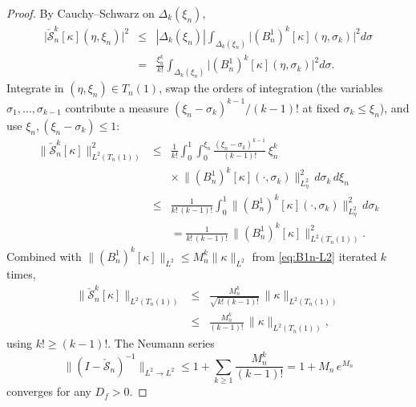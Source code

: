 \documentclass[journal,twoside,web]{ieeecolor}
\begin{document}
\begin{proof}
By Cauchy--Schwarz on $\Delta_k(\xi_n)$,
\begin{eqnarray}
\bigl|\check{\mathcal S}_n^k[\kappa](\eta,\xi_n)\bigr|^2 &\le& |\Delta_k(\xi_n)|\int_{\Delta_k(\xi_n)}\bigl|(B^1_n)^k[\kappa](\eta,\sigma_k)\bigr|^2 d\sigma \nonumber\\
&=& \frac{\xi_n^k}{k!}\int_{\Delta_k(\xi_n)}\bigl|(B^1_n)^k[\kappa](\eta,\sigma_k)\bigr|^2 d\sigma. \label{eq:Sn-CS}
\end{eqnarray}
Integrate in $(\eta,\xi_n)\in T_n(1)$, swap the orders of integration (the variables $\sigma_1,\ldots,\sigma_{k-1}$ contribute a measure $(\xi_n-\sigma_k)^{k-1}/(k-1)!$ at fixed $\sigma_k\le\xi_n$), and use $\xi_n,(\xi_n-\sigma_k)\le 1$:
\begin{eqnarray}
\|\check{\mathcal S}_n^k[\kappa]\|_{L^2(T_n(1))}^2 &\le& \frac{1}{k!}\int_0^1\!\!\int_0^{\xi_n}\!\!\frac{(\xi_n-\sigma_k)^{k-1}}{(k-1)!}\,\xi_n^k \nonumber\\
&& \times\,\|(B^1_n)^k[\kappa](\cdot,\sigma_k)\|_{L^2_\eta}^2\,d\sigma_k\,d\xi_n \nonumber\\
&\le& \frac{1}{k!\,(k-1)!}\int_0^1\!\!\|(B^1_n)^k[\kappa](\cdot,\sigma_k)\|_{L^2_\eta}^2\,d\sigma_k \nonumber\\
&& =\frac{1}{k!\,(k-1)!}\,\|(B^1_n)^k[\kappa]\|_{L^2(T_n(1))}^2. \label{eq:Sn-k-final}
\end{eqnarray}
Combined with $\|(B^1_n)^k[\kappa]\|_{L^2}\le M_n^k\|\kappa\|_{L^2}$ from \eqref{eq:B1n-L2} iterated $k$ times,
\begin{eqnarray}
\|\check{\mathcal S}_n^k[\kappa]\|_{L^2(T_n(1))} &\le& \frac{M_n^k}{\sqrt{k!\,(k-1)!}}\,\|\kappa\|_{L^2(T_n(1))} \nonumber\\
&\le& \frac{M_n^k}{(k-1)!}\,\|\kappa\|_{L^2(T_n(1))}, \label{eq:Sn-iter-bound}
\end{eqnarray}
using $k!\ge(k-1)!$. The Neumann series
\begin{equation}\label{eq:Neumann-series}
\|(I-\check{\mathcal S}_n)^{-1}\|_{L^2\to L^2}\le 1+\sum_{k\ge 1}\frac{M_n^k}{(k-1)!}=1+M_n\,e^{M_n}
\end{equation}
converges for any $D_f>0$.
\end{proof}
\end{document}
